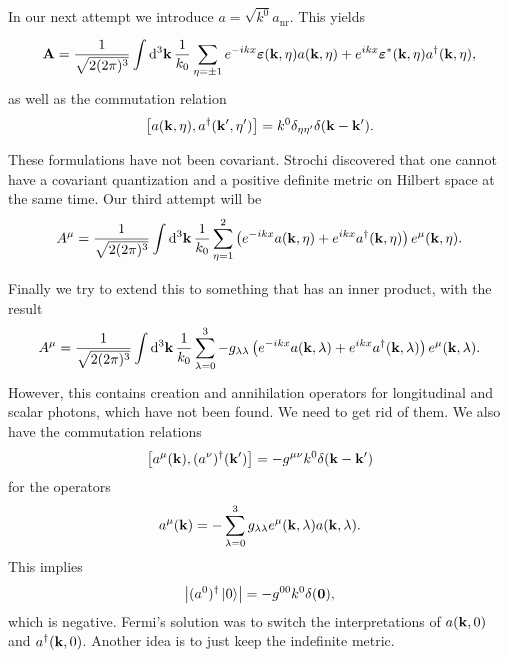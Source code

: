 In our next attempt we introduce $a = \sqrt{k^{0}}a_{\text{nr}}$. This yields
\begin{align*}
	\vb{A} = \frac{1}{\sqrt{2(2\pi)^{3}}}\int\limits_{}^{}\dd[3]{\vb{k}}\frac{1}{k_{0}}\sum\limits_{\eta = \pm 1}e^{-ikx}\vb*{\varepsilon}(\vb{k}, \eta)a(\vb{k}, \eta) + e^{ikx}\vb*{\varepsilon}^{*}(\vb{k}, \eta)a^{\dagger}(\vb{k}, \eta),
\end{align*}
as well as the commutation relation
\begin{align*}
	\comm{a(\vb{k}, \eta)}{a\adj(\vb{k}\p, \eta\p)} = k^{0}\delta_{\eta\eta\p}\delta(\vb{k} - \vb{k}\p).
\end{align*}

These formulations have not been covariant. Strochi discovered that one cannot have a covariant quantization and a positive definite metric on Hilbert space at the same time. Our third attempt will be
\begin{align*}
	A^{\mu} = \frac{1}{\sqrt{2(2\pi)^{3}}}\int\limits_{}^{}\dd[3]{\vb{k}}\frac{1}{k_{0}}\sum\limits_{\eta = 1}^{2}\left(e^{-ikx}a(\vb{k}, \eta) + e^{ikx}a^{\dagger}(\vb{k}, \eta)\right)e^{\mu}(\vb{k}, \eta).
\end{align*}

Finally we try to extend this to something that has an inner product, with the result
\begin{align*}
	A^{\mu} = \frac{1}{\sqrt{2(2\pi)^{3}}}\int\limits_{}^{}\dd[3]{\vb{k}}\frac{1}{k_{0}}\sum\limits_{\lambda = 0}^{3}-g_{\lambda\lambda}\left(e^{-ikx}a(\vb{k}, \lambda) + e^{ikx}a^{\dagger}(\vb{k}, \lambda)\right)e^{\mu}(\vb{k}, \lambda).
\end{align*}
However, this contains creation and annihilation operators for longitudinal and scalar photons, which have not been found. We need to get rid of them. We also have the commutation relations
\begin{align*}
	\comm{a^{\mu}(\vb{k})}{(a^{\nu})\adj(\vb{k}\p)} = -g^{\mu\nu}k^{0}\delta(\vb{k} - \vb{k}\p)
\end{align*}
for the operators
\begin{align*}
	a^{\mu}(\vb{k}) = -\sum\limits_{\lambda = 0}^{3}g_{\lambda\lambda}e^{\mu}(\vb{k}, \lambda)a(\vb{k}, \lambda).
\end{align*}
This implies
\begin{align*}
	\abs{(a^{0})^{\dagger}\ket{0}} = -g^{00}k^{0}\delta(\vb{0}),
\end{align*}
which is negative. Fermi's solution was to switch the interpretations of $a(\vb{k}, 0)$ and $a^{\dagger}(\vb{k}, 0)$. Another idea is to just keep the indefinite metric.

